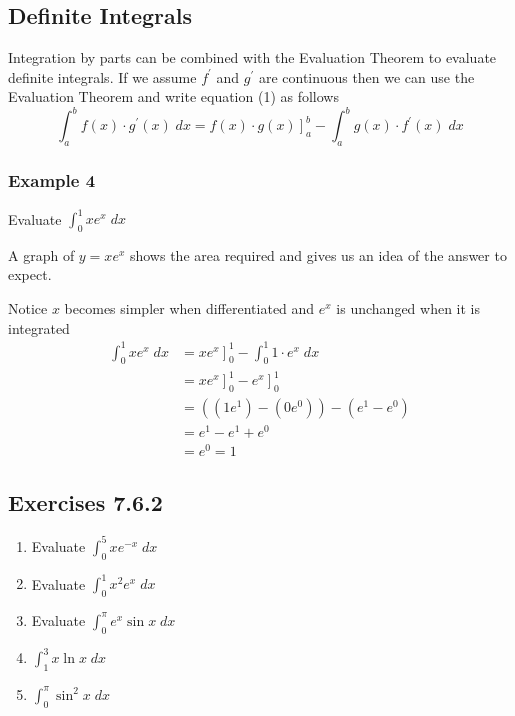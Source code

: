 \subsection{Definite Integrals}
Integration by parts can be combined with the Evaluation Theorem to evaluate definite integrals. If
we assume $f^{ \prime }$ and $g^{ \prime }$ are continuous then we can use the Evaluation Theorem and write equation (1) as follows
\begin{equation}\int _{a}^{b}f (x) \cdot g^{ \prime } (x)\; d x =\left .f (x) \cdot g (x)\right ]_{a}^{b} -\int _{a}^{b}g (x) \cdot f^{ \prime } (x)\; d x\tag{5}
\end{equation}

\subsubsection{Example 4}
Evaluate $\int _{0}^{1}x e^{x}\; d x$ 

A graph of $y =x e^{x}$ shows the area required and gives us an idea of the answer to expect. 

   
\setlength\fboxrule{0.01in}\setlength\fboxsep{0.2in}


Notice $x$ becomes simpler when differentiated and $e^{x}$ is unchanged when it is integrated
\begin{align*}\int _{0}^{1}x e^{x}\; d x &  = \left .x e^{x}\right ]_{0}^{1} -\int _{0}^{1}1 \cdot e^{x}\; d x \\
 &  = \left .x e^{x}\right ]_{0}^{1} -\left .e^{x}\right ]_{0}^{1} \\
 &  = \left (\left (1 e^{1}\right ) -\left (0 e^{0}\right )\right ) -\left (e^{1} -e^{0}\right ) \\
 &  = e^{1} -e^{1} +e^{0} \\
 &  = e^{0} =1\end{align*}

\subsection{Exercises 7.6.2}
\begin{enumerate}
\item Evaluate $\int _{0}^{5}x e^{ -x}\; d x$ 

\item Evaluate $\int _{0}^{1}x^{2} e^{x}\; d x$ 

\item Evaluate $\int _{0}^{\pi }e^{x} \sin  x\; d x$ 

\item $\int _{1}^{3}x \ln  x\; d x$ 

\item $\int _{0}^{\pi }\sin ^{2} x\; d x$ \end{enumerate}


